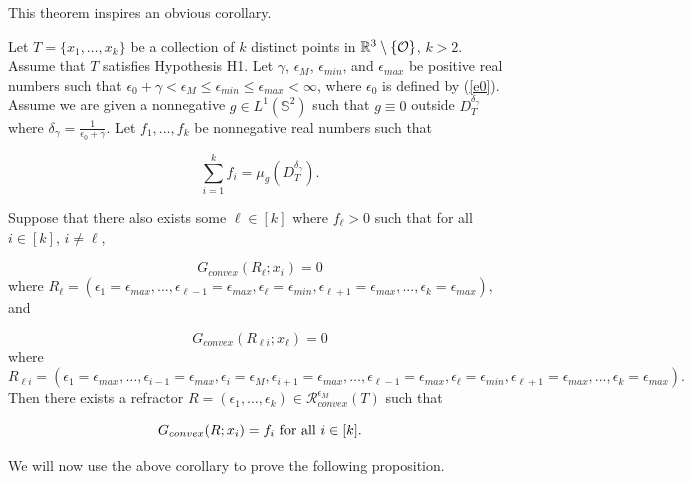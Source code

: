 \documentclass[review]{elsarticle}
\begin{document}
This theorem inspires an obvious corollary.

\begin{coro}\label{wsol3coro}
Let $T = \{x_1,\dots, x_k\}$ be a collection of $k$ distinct points in $\mathbb{R}^3\setminus \{\mathcal{O}\}$, $k > 2.$ Assume that $T$ satisfies Hypothesis H1. Let $\gamma$, $\epsilon_M$, $\epsilon_{min}$, and $\epsilon_{max}$ be positive real numbers such that $\epsilon_0 +\gamma <\epsilon_M \le \epsilon_{min} \le \epsilon_{max} < \infty$, where $\epsilon_0$ is defined by (\ref{e0}). Assume we are given a nonnegative $g\in L^1(\mathbb{S}^2)$ such that $g\equiv 0$ outside $D_T^{\delta_\gamma}$ where $\delta_\gamma=\frac1{\epsilon_0+\gamma}$. Let $f_1,\dots,f_k$ be nonnegative
real numbers such that

\begin{equation}
    \sum_{i=1}^k f_i = \mu_{g}(D_T^{\delta_\gamma}).
\end{equation}

Suppose that there also exists some $\ell \in [k]$ where $f_\ell>0$ such that for all $i \in [k]$, $i \neq \ell$,

\begin{equation}
   G_{convex}(R_\ell; x_i)=0
\end{equation}
where $R_\ell = (\epsilon_1 = \epsilon_{max},...,\epsilon_{\ell-1} = \epsilon_{max}, \epsilon_\ell = \epsilon_{min}, \epsilon_{\ell+1} = \epsilon_{max},...,\epsilon_k = \epsilon_{max}),$ and

\begin{equation}
   G_{convex}(R_{\ell i}; x_\ell) =0
\end{equation}
where $R_{\ell i} = (\epsilon_1 = \epsilon_{max},\dots,\epsilon_{i-1} = \epsilon_{max}, \epsilon_i = \epsilon_M , \epsilon_{i+1} = \epsilon_{max},\dots,\epsilon_{\ell-1} = \epsilon_{max}, \epsilon_\ell =
\epsilon_{min},\epsilon_{\ell+1} = \epsilon_{max},...,\epsilon_k = \epsilon_{max}).$ Then there exists a refractor $R = (\epsilon_1,\dots,\epsilon_k) \in \mathcal{R}_{convex}^{\epsilon_M} (T)$ such
that

\begin{equation}
G_{convex}(R; x_i) = f_i \textnormal{ for all } i \in[k].
\end{equation}
\end{coro}

We will now use the above corollary to prove the following proposition. 
\end{document}
